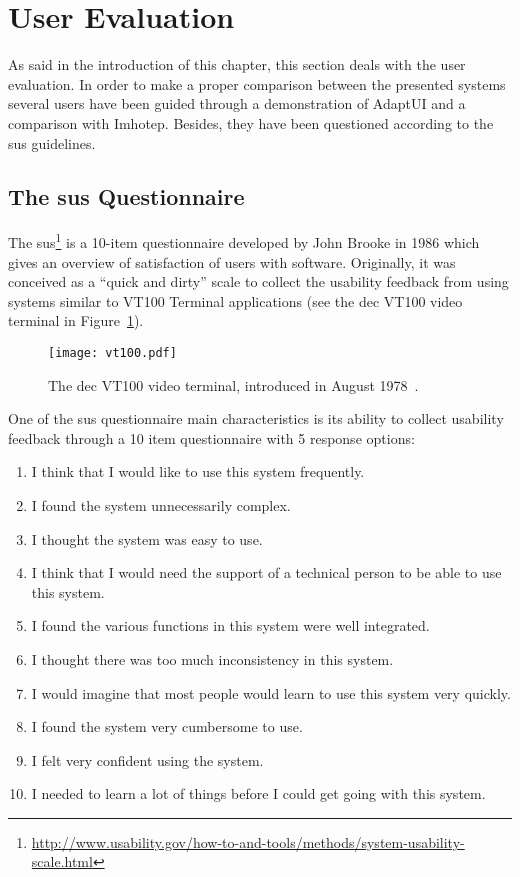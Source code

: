 \section{User Evaluation}
\label{sec:user_evaluation}

As said in the introduction of this chapter, this section deals with the user 
evaluation. In order to make a proper comparison between the presented systems 
several users have been guided through a demonstration of AdaptUI and a 
comparison with Imhotep. Besides, they have been questioned according to the 
\ac{sus} guidelines.

\subsection{The \ac{sus} Questionnaire}
\label{sec:sus}
The \ac{sus}\footnote{\url{http://www.usability.gov/how-to-and-tools/methods/system-usability-scale.html}}
is a 10-item questionnaire developed by John Brooke in 1986 which gives an
overview of satisfaction of users with software. Originally, it was conceived
as a ``quick and dirty'' scale to collect the usability feedback from using
systems similar to VT100 Terminal applications (see the \ac{dec} VT100 video
terminal in Figure~\ref{fig:vt100}).

\begin{figure}
\centering
\texttt{[image: vt100.pdf]}
\caption{The \ac{dec} VT100 video terminal, introduced in August 1978~\citep{vt100}.}
\label{fig:vt100}
\end{figure}

One of the \ac{sus} questionnaire main characteristics is its ability to collect
usability feedback through a 10 item questionnaire with 5 response options: 

\begin{enumerate}
 \item I think that I would like to use this system frequently.
 \item I found the system unnecessarily complex.
 \item I thought the system was easy to use.
 \item I think that I would need the support of a technical person to be able to
 use this system.
 \item I found the various functions in this system were well integrated.
 \item I thought there was too much inconsistency in this system.
 \item I would imagine that most people would learn to use this system very
 quickly.
 \item I found the system very cumbersome to use.
 \item I felt very confident using the system.
 \item I needed to learn a lot of things before I could get going with this
 system.
\end{enumerate}

